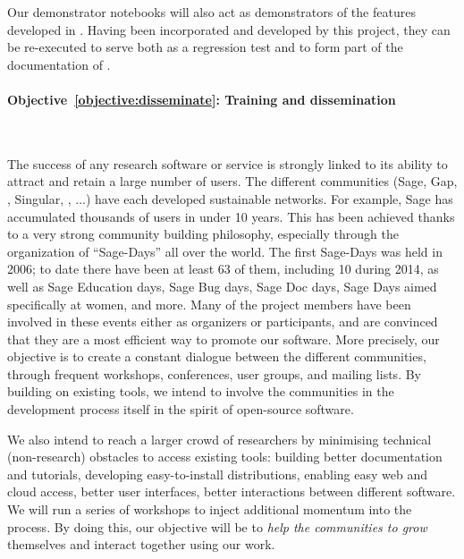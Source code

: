 \documentclass[noworkareas,deliverables,\classoptions]{euproposal}       %
\begin{document}
\begin{proposal}
Our demonstrator notebooks will also act as demonstrators of the
features developed in \TheProject. Having been incorporated and
developed by this project, they can be re-executed to serve both as a
regression test and to form part of the documentation of \TheProject.



\paragraph{Objective~\ref{objective:disseminate}: Training and dissemination}\ 

The success of any research software or service is strongly linked to
its ability to attract and retain a large number of users. The
different communities (Sage, Gap, \PariGP, Singular, \Jupyter, ...)
have each developed sustainable networks. For example, Sage has
accumulated thousands of users in under 10 years. This has been
achieved thanks to a very strong community building philosophy,
especially through the organization of ``Sage-Days'' all over the
world. The first Sage-Days was held in 2006; to date there have been
at least 63 of them, including 10 during 2014, as well as Sage
Education days, Sage Bug days, Sage Doc days, Sage Days aimed
specifically at women, and more. Many of the \TheProject{} project
members have been involved in these events either as organizers or
participants, and are convinced that they are a most efficient way to
promote our software. More precisely, our objective is to create a
constant dialogue between the different communities, through frequent
workshops, conferences, user groups, and mailing lists. By building on
existing tools, we intend to involve the communities in the
development process itself in the spirit of open-source software.

We also intend to reach a larger crowd of researchers by minimising
technical (non-research) obstacles to access existing tools: building
better documentation and tutorials, developing easy-to-install
distributions, enabling easy web and cloud access, better user
interfaces, better interactions between different software.  We will
run a series of workshops to inject additional momentum into the
process. By doing this, our objective will be to \emph{help the
  communities to grow} themselves and interact together using our
work.



\end{proposal}
\end{document}
